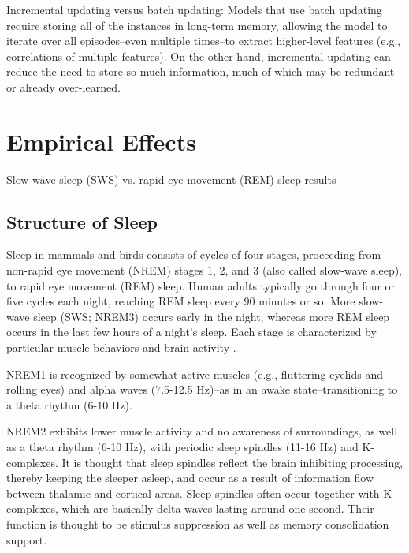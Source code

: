 \documentclass[10pt,letterpaper]{article}
\begin{document}
Incremental updating versus batch updating: 
Models that use batch updating require storing all of the instances in long-term memory, allowing the model to iterate over all episodes--even multiple times--to extract higher-level features (e.g., correlations of multiple features). On the other hand, incremental updating can reduce the need to store so much information, much of which may be redundant or already over-learned. %


\section{Empirical Effects}


Slow wave sleep (SWS) vs. rapid eye movement (REM) sleep results


\subsection{Structure of Sleep}

Sleep in mammals and birds consists of cycles of four stages, proceeding from non-rapid eye movement (NREM) stages 1, 2, and 3 (also called slow-wave sleep), to rapid eye movement (REM) sleep. Human adults typically go through four or five cycles each night, reaching REM sleep every 90 minutes or so. More slow-wave sleep (SWS; NREM3) occurs early in the night, whereas more REM sleep occurs in the last few hours of a night's sleep. Each stage is characterized by particular muscle behaviors and brain activity \cite{Schulz:2008}. 

NREM1 is recognized by somewhat active muscles (e.g., fluttering eyelids and rolling eyes) and alpha waves (7.5-12.5 Hz)--as in an awake state--transitioning to a theta rhythm (6-10 Hz). 

NREM2 exhibits lower muscle activity and no awareness of surroundings, as well as a theta rhythm (6-10 Hz), with periodic sleep spindles (11-16 Hz) and K-complexes. It is thought that sleep spindles reflect the brain inhibiting processing, thereby keeping the sleeper asleep, and occur as a result of information flow between thalamic and cortical areas. Sleep spindles often occur together with K-complexes, which are basically delta waves lasting around one second. Their function is thought to be stimulus suppression as well as memory consolidation support.
\end{document}
